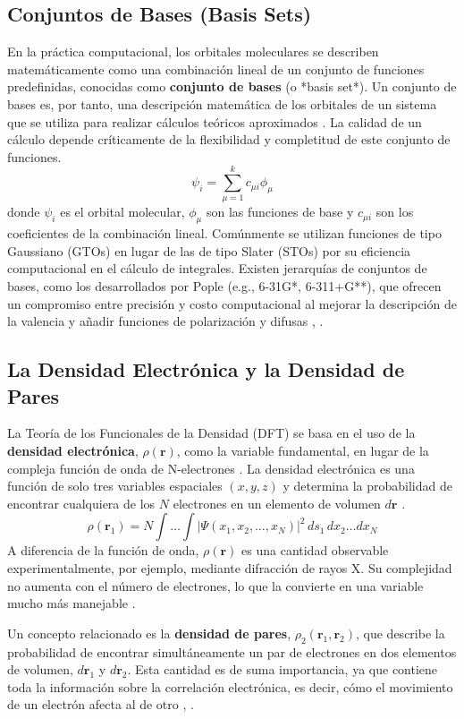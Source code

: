 \subsection{Conjuntos de Bases (Basis Sets)}
En la práctica computacional, los orbitales moleculares se describen matemáticamente como una combinación lineal de un conjunto de funciones predefinidas, conocidas como \textbf{conjunto de bases} (o *basis set*). Un conjunto de bases es, por tanto, una descripción matemática de los orbitales de un sistema que se utiliza para realizar cálculos teóricos aproximados \cite[131]{ramachandran2008computational}. La calidad de un cálculo depende críticamente de la flexibilidad y completitud de este conjunto de funciones.
$$ \psi_i = \sum_{\mu=1}^{k} c_{\mu i} \phi_{\mu} $$
donde $\psi_i$ es el orbital molecular, $\phi_{\mu}$ son las funciones de base y $c_{\mu i}$ son los coeficientes de la combinación lineal. Comúnmente se utilizan funciones de tipo Gaussiano (GTOs) en lugar de las de tipo Slater (STOs) por su eficiencia computacional en el cálculo de integrales. Existen jerarquías de conjuntos de bases, como los desarrollados por Pople (e.g., 6-31G*, 6-311+G**), que ofrecen un compromiso entre precisión y costo computacional al mejorar la descripción de la valencia y añadir funciones de polarización y difusas \cite[195]{szabo1996modern}, \cite[140]{ramachandran2008computational}.


\subsection{La Densidad Electrónica y la Densidad de Pares}
La Teoría de los Funcionales de la Densidad (DFT) se basa en el uso de la \textbf{densidad electrónica}, $\rho(\mathbf{r})$, como la variable fundamental, en lugar de la compleja función de onda de N-electrones \cite[187]{ramachandran2008computational}. La densidad electrónica es una función de solo tres variables espaciales $(x, y, z)$ y determina la probabilidad de encontrar cualquiera de los $N$ electrones en un elemento de volumen $d\mathbf{r}$ \cite[36]{koch2015chemist}.
$$ \rho(\mathbf{r}_1) = N \int \dots \int |\Psi(x_1, x_2, \dots, x_N)|^2 \, ds_1 \, dx_2 \dots dx_N $$
A diferencia de la función de onda, $\rho(\mathbf{r})$ es una cantidad observable experimentalmente, por ejemplo, mediante difracción de rayos X. Su complejidad no aumenta con el número de electrones, lo que la convierte en una variable mucho más manejable \cite[p. 253]{jensen2017introduction}.

Un concepto relacionado es la \textbf{densidad de pares}, $\rho_2(\mathbf{r}_1, \mathbf{r}_2)$, que describe la probabilidad de encontrar simultáneamente un par de electrones en dos elementos de volumen, $d\mathbf{r}_1$ y $d\mathbf{r}_2$. Esta cantidad es de suma importancia, ya que contiene toda la información sobre la correlación electrónica, es decir, cómo el movimiento de un electrón afecta al de otro \cite[188]{ramachandran2008computational}, \cite[38]{koch2015chemist}.

